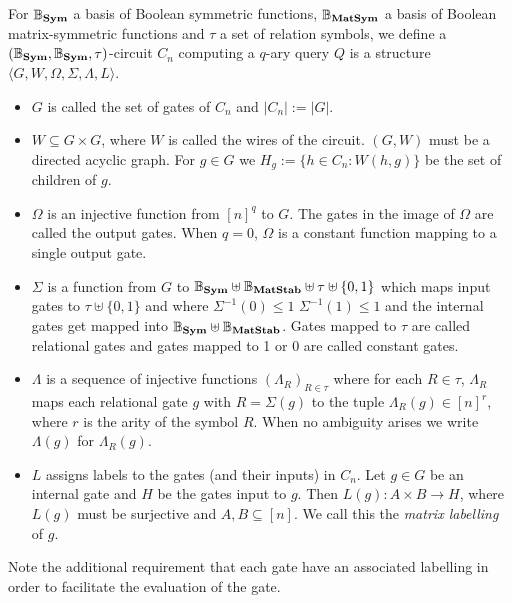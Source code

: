 \documentclass[12pt]{report}
\newcommand{\matstab}{\text{\textbf{MatStab}}}
\newcommand{\sym}{\text{\textbf{Sym}}}
\newcommand{\matsym}{\text{\textbf{MatSym}}}
\begin{document}
\begin{definition}
  For $\mathbb{B}_{\sym}$ a basis of Boolean symmetric functions,
  $\mathbb{B}_{\matsym}$ a basis of Boolean matrix-symmetric functions and
  $\tau$ a set of relation symbols, we define a $(\mathbb{B}_\sym,
  \mathbb{B}_\sym, \tau)$-circuit $C_n$ computing a $q$-ary query $Q$ is a
  structure $\langle G, W, \Omega, \Sigma, \Lambda, L\rangle$.
  \begin{itemize}
    \setlength\itemsep{0mm}
  \item $G$ is called the set of gates of $C_n$ and $\vert C_n \vert := \vert G
    \vert$.
  \item $W \subseteq G \times G$, where $W$ is called the wires of the circuit.
    $(G,W)$ must be a directed acyclic graph. For $g \in G$ we $H_g := \{ h \in
    C_n : W(h,g)\}$ be the set of children of $g$.
  \item $\Omega$ is an injective function from $[n]^q$ to $G$. The gates in the
    image of $\Omega$ are called the output gates. When $q = 0$, $\Omega$ is a
    constant function mapping to a single output gate.
  \item $\Sigma$ is a function from $G$ to $\mathbb{B}_\sym \uplus
    \mathbb{B}_\matstab \uplus \tau \uplus \{0,1\} $ which maps input gates to
    $\tau \uplus \{0,1\}$ and where $\Sigma^{-1} (0) \leq 1$ $\Sigma^{-1} (1)
    \leq 1$ and the internal gates get mapped into $\mathbb{B}_\sym \uplus
    \mathbb{B}_\matstab$. Gates mapped to $\tau$ are called relational gates and
    gates mapped to 1 or 0 are called constant gates.
  \item $\Lambda$ is a sequence of injective functions $(\Lambda_R)_{R \in
      \tau}$ where for each $R \in \tau$, $\Lambda_R$ maps each relational gate
    $g$ with $R = \Sigma (g)$ to the tuple $\Lambda_R (g) \in [n]^r$, where $r$
    is the arity of the symbol $R$. When no ambiguity arises we write $\Lambda
    (g)$ for $\Lambda_R (g)$.
  \item $L$ assigns labels to the gates (and their inputs) in $C_n$. Let $g \in
    G$ be an internal gate and $H$ be the gates input to $g$. Then $L(g) : A
    \times B \rightarrow H$, where $L(g)$ must be surjective and $A, B \subseteq
    [n]$. We call this the \emph{matrix labelling} of $g$.
  \end{itemize}
\end{definition}

Note the additional requirement that each gate have an associated labelling in
order to facilitate the evaluation of the gate.
\end{document}
